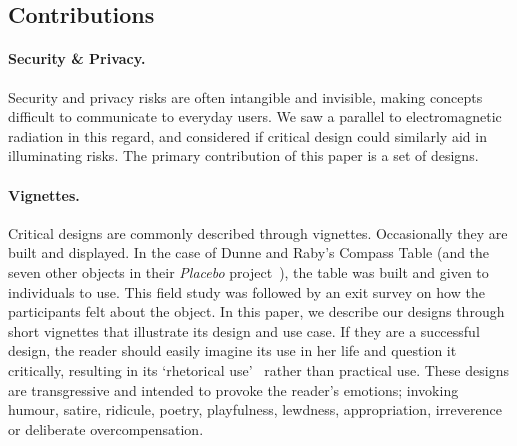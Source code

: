 %
%

\subsection{Contributions}

\paragraph{Security \& Privacy.} Security and privacy risks are often intangible and invisible, making concepts difficult to communicate to everyday users. We saw a parallel to electromagnetic radiation in this regard, and considered if critical design could similarly aid in illuminating risks. The primary contribution of this paper is a set of designs.

\paragraph{Vignettes.} Critical designs are commonly described through vignettes. Occasionally they are built and displayed. In the case of Dunne and Raby's Compass Table (and the seven other objects in their \textit{Placebo} project~\cite{DuRa01}), the table was built and given to individuals to use. This field study was followed by an exit survey on how the participants felt about the object. In this paper, we describe our designs through short vignettes that illustrate its design and use case. If they are a successful design, the reader should easily imagine its use in her life and question it critically, resulting in its `rhetorical use'~\cite{Mal17} rather than practical use. These designs are transgressive and intended to provoke the reader's emotions; invoking humour, satire, ridicule, poetry, playfulness, lewdness, appropriation, irreverence or deliberate overcompensation.

